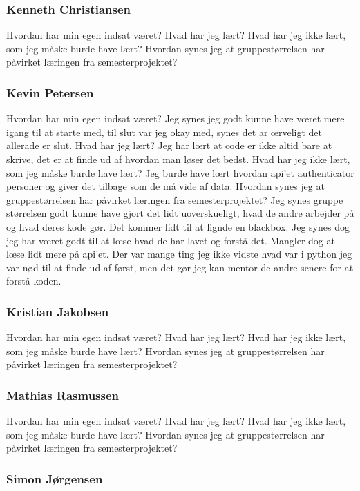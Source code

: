\subsubsection{Kenneth Christiansen}
Hvordan har min egen indsat været?
Hvad har jeg lært?
Hvad har jeg ikke lært, som jeg måske burde have lært?
Hvordan synes jeg at gruppestørrelsen har påvirket læringen fra semesterprojektet?

\subsubsection{Kevin Petersen}
Hvordan har min egen indsat været?
Jeg synes jeg godt kunne have vœret mere igang til at starte med, til slut var jeg okay med, synes det ar œrveligt det allerade er slut.
Hvad har jeg lært?
Jeg har lœrt at code er ikke altid bare at skrive, det er at finde ud af hvordan man løser det bedst.
Hvad har jeg ikke lært, som jeg måske burde have lært?
Jeg burde have lœrt hvordan api'et authenticator personer og giver det tilbage som de må vide af data.
Hvordan synes jeg at gruppestørrelsen har påvirket læringen fra semesterprojektet?
Jeg synes gruppe størrelsen godt kunne have gjort det lidt uoverskueligt, hvad de andre arbejder på og hvad deres kode gør.
Det kommer lidt til at lignde en blackbox.
Jeg synes dog jeg har vœret godt til at lœse hvad de har lavet og forstå det. Mangler dog at lœse lidt mere på api'et.
Der var mange ting jeg ikke vidste hvad var i python jeg var nød til at finde ud af først, men det gør jeg kan mentor de andre senere for at forstå koden.



\subsubsection{Kristian Jakobsen}
Hvordan har min egen indsat været?
Hvad har jeg lært?
Hvad har jeg ikke lært, som jeg måske burde have lært?
Hvordan synes jeg at gruppestørrelsen har påvirket læringen fra semesterprojektet?

\subsubsection{Mathias Rasmussen}
Hvordan har min egen indsat været?
Hvad har jeg lært?
Hvad har jeg ikke lært, som jeg måske burde have lært?
Hvordan synes jeg at gruppestørrelsen har påvirket læringen fra semesterprojektet?


\subsubsection{Simon Jørgensen}